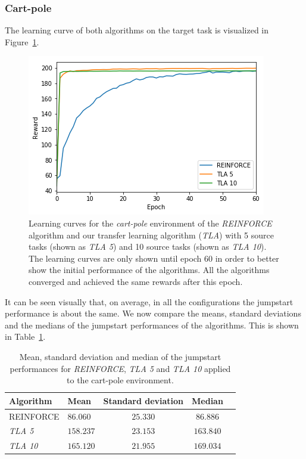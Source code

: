 \subsubsection{Cart-pole} %
\label{ssub:without_sparse_representation_transfer:cartpole}
The learning curve of both algorithms on the target task is visualized in Figure~\ref{fig:CartPole:reward_target_re-akt5-akt10}.
\begin{figure}[htb]
    \centering
    \includegraphics[width=.8\linewidth]{images/results/CartPole/no_sparse_transfer/reward_target_re-akt5-akt10.png}
    \caption[Learning curves for \textit{REINFORCE} and \textit{TLA} for the \emph{Cart-pole} environment]{Learning curves for the \textit{cart-pole} environment of the \textit{REINFORCE} algorithm and our transfer learning algorithm (\textit{TLA}) with 5 source tasks (shown as \textit{TLA 5}) and 10 source tasks (shown as \textit{TLA 10}). The learning curves are only shown until epoch 60 in order to better show the initial performance of the algorithms. All the algorithms converged and achieved the same rewards after this epoch.}
    \label{fig:CartPole:reward_target_re-akt5-akt10}
\end{figure}
It can be seen visually that, on average, in all the configurations the jumpstart performance is about the same. We now compare the means, standard deviations and the medians of the jumpstart performances of the algorithms. This is shown in Table~\ref{tab:cartpole:nosparse:stats}.
\begin{table}[htb]
    \centering
    \begin{tabular}{llccc}
    \hline
    Algorithm & Mean & Standard deviation & Median \\
    \hline
       REINFORCE  & $86.060$ & $25.330$ & $86.886$ \\
       \textit{TLA 5} & $158.237$ & $23.153$ & $163.840$ \\
       \textit{TLA 10} & $\bm{165.120}$ & $21.955$ & $\bm{169.034}$ \\
    \hline
    \end{tabular}
    \caption{Mean, standard deviation and median of the jumpstart performances for \textit{REINFORCE}, \textit{TLA 5} and \textit{TLA 10} applied to the cart-pole environment.}
    \label{tab:cartpole:nosparse:stats}
\end{table}
